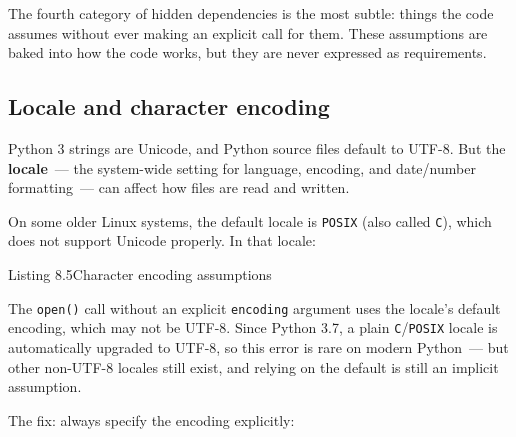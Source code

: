 The fourth category of hidden dependencies is the most subtle: things the code assumes without ever making an explicit call for them. These assumptions are baked into how the code works, but they are never expressed as requirements.

\subsection*{Locale and character encoding}\label{08-hidden-dependencies:locale-and-character-encoding}

Python 3 strings are Unicode, and Python source files default to UTF-8. But the \textbf{locale}~--- the system-wide setting for language, encoding, and date/number formatting~--- can affect how files are read and written.

On some older Linux systems, the default locale is \texttt{POSIX} (also called \texttt{C}), which does not support Unicode properly. In that locale:

\begin{codeboxcap}[short]{\textcolor{accent}{Listing 8.5}\enspace Character encoding assumptions}

\begin{Shaded}
\begin{Highlighting}[]
 \NormalTok{(}\NormalTok{, }\NormalTok{) }
\NormalTok{)}
\end{Highlighting}
\end{Shaded}

\end{codeboxcap}

\noindent{}The \texttt{open()} call without an explicit \texttt{encoding} argument uses the locale's default encoding, which may not be UTF-8. Since Python 3.7, a plain \texttt{C}/\texttt{POSIX} locale is automatically upgraded to UTF-8, so this error is rare on modern Python~--- but other non-UTF-8 locales still exist, and relying on the default is still an implicit assumption.

The fix: always specify the encoding explicitly:

